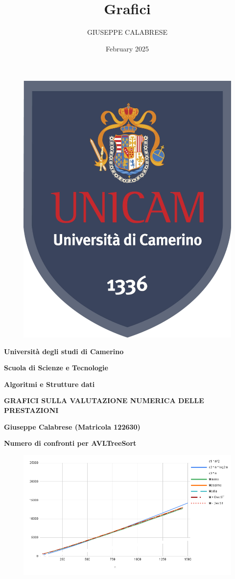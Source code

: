\documentclass{article}
\title{Grafici}
\author{GIUSEPPE CALABRESE}
\date{February 2025}
\begin{document}
\begin{figure}
    \centering
    \includegraphics[width=0.5\linewidth]{Logo Unicam/unicam.jpg}
    \label{fig:enter-label}
\end{figure}

\centering
{\Large \textbf{Università degli studi di Camerino}     \par
    \vspace{1 cm}
        \Large \textbf{Scuola di Scienze e Tecnologie}  \par
        \Large \textbf{Algoritmi e Strutture dati}      \par
    \vspace{4 cm}
        \Large \textbf{GRAFICI SULLA VALUTAZIONE NUMERICA DELLE PRESTAZIONI} \par
    \vspace{1 cm}
        \Large \textbf{Giuseppe Calabrese (Matricola 122630)}}


\newpage
\vspace*{-2.4 cm}
\begin{center}
    \Large \textbf{Numero di confronti per AVLTreeSort}
    \begin{figure}[h]
        \centering
        \includegraphics[width=0.98\linewidth]{Grafici/AVLTreeSort.png}
        \label{fig:graph}
    \end{figure}
\end{center}
\end{document}
